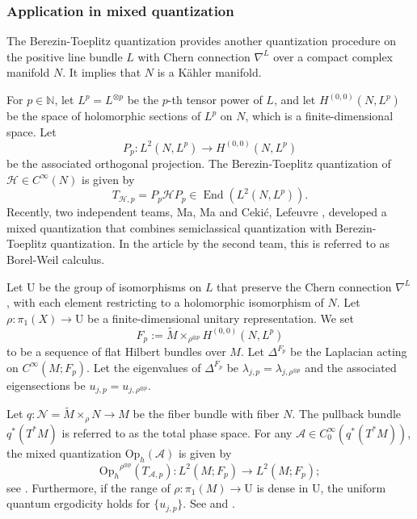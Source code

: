 \documentclass[11pt,oneside,reqno]{amsart}
\newcommand\Oph{\ensuremath{\mathrm{Op}_h}}
\theoremstyle{definition}
\numberwithin{equation}{section}
\theoremstyle{plain}
\begin{document}
\subsubsection{Application in mixed quantization}
The Berezin-Toeplitz quantization provides another quantization procedure on the positive line bundle $L$ with Chern connection $\nabla^{L}$ over a compact complex manifold $N$. It implies that $N$ is a Kähler manifold. 

For $p \in \mathbb{N}$, let $L^p=L^{\otimes p}$ be the $p$-th tensor power of $L$, and let $H^{(0,0)}(N, L^p)$ be the space of holomorphic sections of $L^p$ on $N$, which is a finite-dimensional space. Let 
\begin{equation*}
    P_p: L^2(N, L^p) \rightarrow H^{(0,0)}(N, L^p)
\end{equation*}
be the associated orthogonal projection. The Berezin-Toeplitz quantization of $\mathcal{H} \in C^{\infty}(N)$ is given by 
\begin{equation*}
    T_{\mathcal{H}, p}=P_{p}\mathcal{H}P_{p} \in \operatorname{End}\left(L^2(N, L^{p})\right).
\end{equation*} 
Recently, two independent teams, Ma, Ma \cite{mama2024semiclassical} and Cekić, Lefeuvre \cite{cekiclefeuvre2024semiclassical}, developed a mixed quantization that combines semiclassical quantization with Berezin-Toeplitz quantization. In the article by the second team, this is referred to as Borel-Weil calculus.

Let $\mathrm{U}$ be the group of isomorphisms on $L$ that preserve the Chern connection $\nabla^L$, with each element restricting to a holomorphic isomorphism of $N$. Let $\rho: \pi_1(X) \rightarrow \mathrm{U}$ be a finite-dimensional unitary representation. We set 
\begin{equation*}
    F_p:=\widetilde{M} \times_{\rho^{\otimes p}} H^{(0,0)}(N, L^p)
\end{equation*}
to be a sequence of flat Hilbert bundles over $M$. Let $\Delta^{F_p}$ be the Laplacian acting on $C^{\infty}(M; F_p)$. Let the eigenvalues of $\Delta^{F_p}$ be $\lambda_{j,p}=\lambda_{j,\rho^{\otimes p}}$ and the associated eigensections be $u_{j,p}=u_{j,\rho^{\otimes p}}$.

Let $q: \mathcal{N}=\widetilde{M}\times_{\rho}N\to M$ be the fiber bundle with fiber $N$. The pullback bundle $q^*(T^*M)$ is referred to as the total phase space. For any $\mathcal{A}\in C_{0}^{\infty}(q^*(T^*M))$, the mixed quantization $\Oph(\mathcal{A})$ is given by 
\begin{equation*}
    \Oph^{\rho^{\otimes p}}(T_{\mathcal{A},p}): L^2(M;F_p)\to L^2(M;F_p);
\end{equation*}
see \cite{mama2024semiclassical, cekiclefeuvre2024semiclassical}. Furthermore, if the range of $\rho:\pi_{1}(M)\to \mathrm{U}$ is dense in $\mathrm{U}$, the uniform quantum ergodicity holds for $\{u_{j,p}\}$. See \cite[Theorem 1.5 and 1.6]{mama2024semiclassical} and \cite[Section 5.3]{cekiclefeuvre2024semiclassical}.
\end{document}
